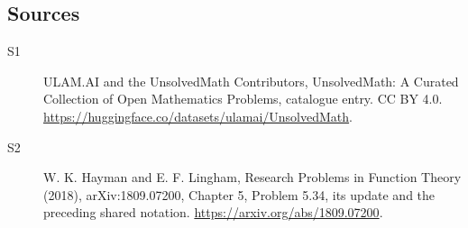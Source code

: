 \documentclass[11pt]{article}
\begin{document}
\subsection{Sources}
\begin{description}
\item[\hypertarget{source:statement:1}{S1}] ULAM.AI and the UnsolvedMath Contributors, UnsolvedMath: A Curated Collection of Open Mathematics Problems, catalogue entry. CC BY 4.0. \url{https://huggingface.co/datasets/ulamai/UnsolvedMath}.
\item[\hypertarget{source:statement:2}{S2}] W. K. Hayman and E. F. Lingham, Research Problems in Function Theory (2018), arXiv:1809.07200, Chapter 5, Problem 5.34, its update and the preceding shared notation. \url{https://arxiv.org/abs/1809.07200}.
\end{description}
\label{end:statement}
\end{document}
